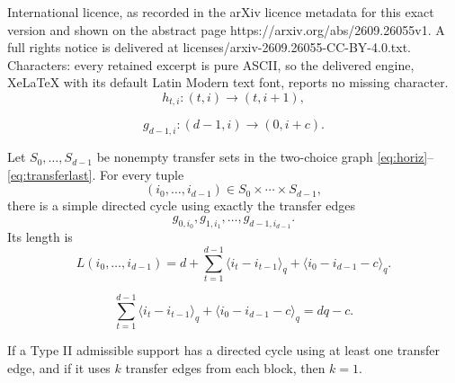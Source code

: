 \documentclass[10pt,a4paper]{amsart}
\begin{document}
International licence, as recorded in the arXiv licence metadata for this exact version and shown on the abstract page https://arxiv.org/abs/2609.26055v1. A full rights notice is delivered at licenses/arxiv-2609.26055-CC-BY-4.0.txt. Characters: every retained excerpt is pure ASCII, so the delivered engine, XeLaTeX with its default Latin Modern text font, reports no missing character.
\begin{equation}
        h_{t,i}:(t,i)\longrightarrow(t,i+1),
        \label{eq:horiz}
\end{equation}

\begin{equation}
        g_{d-1,i}:(d-1,i)\longrightarrow(0,i+c).
        \label{eq:transferlast}
\end{equation}

\begin{lemma}
\label{lem:tuple-simple}
Let $S_0,\ldots,S_{d-1}$ be nonempty transfer sets in the two-choice graph \eqref{eq:horiz}--\eqref{eq:transferlast}.  For every tuple
\[
        (i_0,\ldots,i_{d-1})\in S_0\times\cdots\times S_{d-1},
\]
there is a simple directed cycle using exactly the transfer edges
\[
        g_{0,i_0},g_{1,i_1},\ldots,g_{d-1,i_{d-1}}.
\]
Its length is
\begin{equation}
        L(i_0,\ldots,i_{d-1})
        =d+\sum_{t=1}^{d-1}\langle i_t-i_{t-1}\rangle_q
          +\langle i_0-i_{d-1}-c\rangle_q .
        \label{eq:lengthone}
\end{equation}
\end{lemma}

\begin{equation}
        \sum_{t=1}^{d-1}\langle i_t-i_{t-1}\rangle_q
          +\langle i_0-i_{d-1}-c\rangle_q
        =dq-c .
        \label{eq:constantcarry}
\end{equation}

\begin{lemma}
\label{lem:kone}
If a Type II admissible support has a directed cycle using at least one transfer edge, and if it uses $k$ transfer edges from each block, then $k=1$.
\end{lemma}
\end{document}
